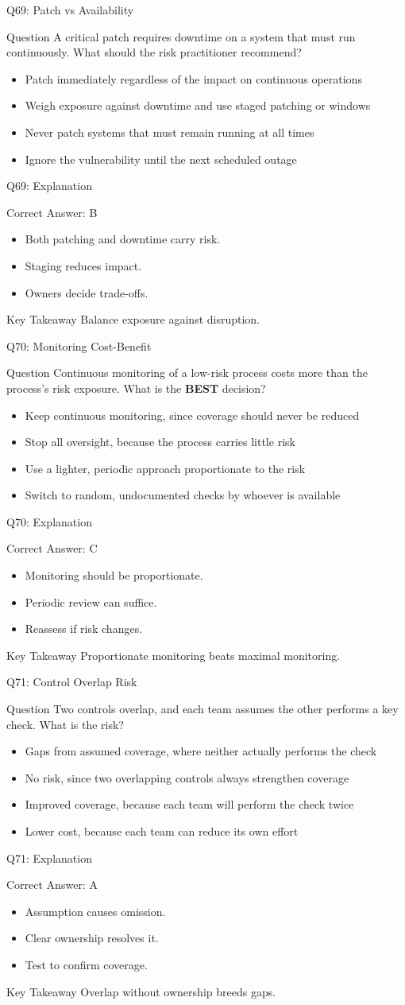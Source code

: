\documentclass[aspectratio=169]{beamer}
\newcommand{\hq}[7]{%
	\begin{frame}{Q#1: #2}
		\begin{block}{Question}
			#3
		\end{block}
		\begin{itemize}
			#4
		\end{itemize}
	\end{frame}
	\begin{frame}{Q#1: Explanation}
		\begin{block}{Correct Answer: #5}
			\begin{itemize}
				#6
			\end{itemize}
		\end{block}
		\begin{alertblock}{Key Takeaway}
			#7
		\end{alertblock}
	\end{frame}
}
\begin{document}
	\hq{69}{Patch vs Availability}
	{A critical patch requires downtime on a system that must run continuously. What should the risk practitioner recommend?}
	{\item[\textbf{(A)}] Patch immediately regardless of the impact on continuous operations
		\item[\textbf{(B)}] Weigh exposure against downtime and use staged patching or windows
		\item[\textbf{(C)}] Never patch systems that must remain running at all times
		\item[\textbf{(D)}] Ignore the vulnerability until the next scheduled outage}
	{B}
	{\item Both patching and downtime carry risk.
		\item Staging reduces impact.
		\item Owners decide trade-offs.}
	{Balance exposure against disruption.}

	\hq{70}{Monitoring Cost-Benefit}
	{Continuous monitoring of a low-risk process costs more than the process's risk exposure. What is the \textbf{BEST} decision?}
	{\item[\textbf{(A)}] Keep continuous monitoring, since coverage should never be reduced
		\item[\textbf{(B)}] Stop all oversight, because the process carries little risk
		\item[\textbf{(C)}] Use a lighter, periodic approach proportionate to the risk
		\item[\textbf{(D)}] Switch to random, undocumented checks by whoever is available}
	{C}
	{\item Monitoring should be proportionate.
		\item Periodic review can suffice.
		\item Reassess if risk changes.}
	{Proportionate monitoring beats maximal monitoring.}

	\hq{71}{Control Overlap Risk}
	{Two controls overlap, and each team assumes the other performs a key check. What is the risk?}
	{\item[\textbf{(A)}] Gaps from assumed coverage, where neither actually performs the check
		\item[\textbf{(B)}] No risk, since two overlapping controls always strengthen coverage
		\item[\textbf{(C)}] Improved coverage, because each team will perform the check twice
		\item[\textbf{(D)}] Lower cost, because each team can reduce its own effort}
	{A}
	{\item Assumption causes omission.
		\item Clear ownership resolves it.
		\item Test to confirm coverage.}
	{Overlap without ownership breeds gaps.}
\end{document}
